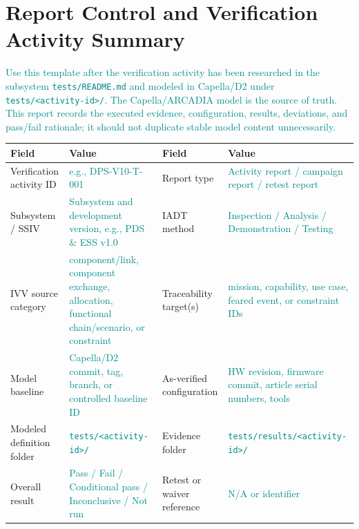 \documentclass{../common/latex/delta_base_styles/delta_base_styles}
\newcommand{\placeholder}[1]{\textcolor{DarkCyan}{#1}}
\begin{document}
\makedeltaheader

\section{Report Control and Verification Activity Summary}
\makeversionapprovaltable

\placeholder{Use this template after the verification activity has been researched in the subsystem \texttt{tests/README.md} and modeled in Capella/D2 under \texttt{tests/<activity-id>/}. The Capella/ARCADIA model is the source of truth. This report records the executed evidence, configuration, results, deviations, and pass/fail rationale; it should not duplicate stable model content unnecessarily.}

\renewcommand{\arraystretch}{1.3}
\setlength{\tabcolsep}{3pt}
\begin{tabular}{|>{\centering\arraybackslash}m{3.1cm}
                |>{\centering\arraybackslash}m{4.1cm}
                |>{\centering\arraybackslash}m{3.6cm}
                |>{\centering\arraybackslash}m{4.1cm}|}
\hline
\textbf{Field} & \textbf{Value} & \textbf{Field} & \textbf{Value} \\
\hline
Verification activity ID & \placeholder{e.g., DPS-V10-T-001} & Report type & \placeholder{Activity report / campaign report / retest report} \\
\hline
Subsystem / SSIV & \placeholder{Subsystem and development version, e.g., PDS \& ESS v1.0} & IADT method & \placeholder{Inspection / Analysis / Demonstration / Testing} \\
\hline
IVV source category & \placeholder{component/link, component exchange, allocation, functional chain/scenario, or constraint} & Traceability target(s) & \placeholder{mission, capability, use case, feared event, or constraint IDs} \\
\hline
Model baseline & \placeholder{Capella/D2 commit, tag, branch, or controlled baseline ID} & As-verified configuration & \placeholder{HW revision, firmware commit, article serial numbers, tools} \\
\hline
Modeled definition folder & \placeholder{\texttt{tests/<activity-id>/}} & Evidence folder & \placeholder{\texttt{tests/results/<activity-id>/}} \\
\hline
Overall result & \placeholder{Pass / Fail / Conditional pass / Inconclusive / Not run} & Retest or waiver reference & \placeholder{N/A or identifier} \\
\hline
\end{tabular}
\end{document}
